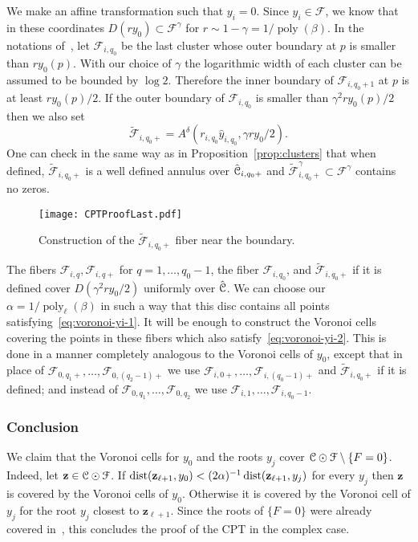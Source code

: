 \documentclass[reqno]{amsart}
\renewcommand\~[1]{\widetilde{#1}}
\def\poly{\operatorname{poly}} \def\J{\operatorname{J}}
\def\cF{{\mathcal F}} \def\cL{{\mathcal L}} \def\cR{{\mathcal R}}
\def\vz{{\mathbf z}}
\begin{document}
We make an affine transformation such that $y_i=0$. Since $y_i\in\cF$,
we know that in these coordinates $D(r y_0)\subset\cF^\gamma$ for
$r\sim1-\gamma=1/\poly(\beta)$. In the notations
of~, let $\cF_{i,q_0}$ be the last
cluster whose outer boundary at $p$ is smaller than $ry_0(p)$.  With
our choice of $\gamma$ the logarithmic width of each cluster can be
assumed to be bounded by $\log 2$. Therefore the inner boundary of
$\cF_{i,q_0+1}$ at $p$ is at least $ry_0(p)/2$. If the outer boundary
of $\cF_{i,q_0}$ is smaller than $\gamma^2ry_0(p)/2$ then we also set
\begin{equation}
  \tilde\cF_{i,q_0+}=A^\delta(r_{i,q_0}\hat y_{i,q_0},\gamma r y_0/2).
\end{equation}
One can check in the same way as in Proposition~\ref{prop:clusters}
that when defined, $\tilde\cF_{i,q_0+}$ is a well defined annulus over
$\hat{{\mathcal C}}_{i,q_0+}$ and $\tilde\cF_{i,q_0+}^\gamma\subset\cF^\gamma$
contains no zeros.

\begin{figure}
  \centering
  \texttt{[image: CPTProofLast.pdf]}
  \caption{Construction of the $\tilde\cF_{i,q_0+}$ fiber near the boundary.}
  \label{fig:cpt-proof-last}
\end{figure}

The fibers $\cF_{i,q},\cF_{i,q+}$ for $q=1,\ldots,q_0-1$, the fiber
$\cF_{i,q_0}$, and $\tilde\cF_{i,q_0+}$ if it is defined cover
$D(\gamma^2 r y_0/2)$ uniformly over $\hat{{\mathcal C}}$. We can choose our
$\alpha=1/\poly_\ell(\beta)$ in such a way that this disc contains all
points satisfying~\eqref{eq:voronoi-yi-1}. It will be enough to
construct the Voronoi cells covering the points in these fibers which
also satisfy~\eqref{eq:voronoi-yi-2}. This is done in a manner
completely analogous to the Voronoi cells of $y_0$, except that in
place of $\cF_{0,q_1+},\ldots,\cF_{0,(q_2-1)+}$ we use
$\cF_{i,0+},\ldots,\cF_{i,(q_0-1)+}$ and $\tilde\cF_{i,q_0+}$ if it is
defined; and instead of $\cF_{0,q_1},\ldots,\cF_{0,q_2}$ we use
$\cF_{i,1},\ldots,\cF_{i,q_0-1}$.


\subsubsection{Conclusion}

We claim that the Voronoi cells for $y_0$ and the roots $y_j$ cover
$\cC\odot\cF\setminus\{F=0\}$. Indeed, let $\vz\in\cC\odot\cF$. If
$\dist(\vz_{\ell+1},y_0) < (2\alpha)^{-1}\dist(\vz_{\ell+1},y_j)$ for
every $y_j$ then $\vz$ is covered by the Voronoi cells of
$y_0$. Otherwise it is covered by the Voronoi cell of $y_j$ for the
root $y_j$ closest to $\vz_{\ell+1}$. Since the roots of $\{F=0\}$
were already covered in~, this concludes
the proof of the CPT in the complex case.
\end{document}
